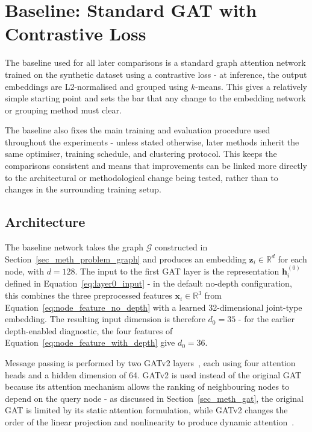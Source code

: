 \section{Baseline: Standard GAT with Contrastive Loss}
\label{sec_meth_baseline}

The baseline used for all later comparisons is a standard graph attention network
trained on the synthetic dataset using a contrastive loss -
at inference, the output embeddings are L2-normalised and grouped using $k$-means.
This gives a relatively simple starting point
and sets the bar that any change to the embedding network or grouping method must clear.

The baseline also fixes the main training and evaluation procedure used throughout the experiments -
unless stated otherwise,
later methods inherit the same optimiser, training schedule, and clustering protocol.
This keeps the comparisons consistent
and means that improvements can be linked more directly
to the architectural or methodological change being tested,
rather than to changes in the surrounding training setup.

\subsection{Architecture}
\label{sec_meth_baseline_arch}

The baseline network takes the graph $\mathcal{G}$ constructed in Section~\ref{sec_meth_problem_graph}
and produces an embedding $\mathbf{z}_i \in \mathbb{R}^{d}$ for each node, with $d=128$.
The input to the first GAT layer is the representation $\mathbf{h}_i^{(0)}$
defined in Equation~\eqref{eq:layer0_input} -
in the default no-depth configuration,
this combines the three preprocessed features $\mathbf{x}_i \in \mathbb{R}^{3}$
from Equation~\eqref{eq:node_feature_no_depth}
with a learned 32-dimensional joint-type embedding.
The resulting input dimension is therefore $d_0=35$ -
for the earlier depth-enabled diagnostic,
the four features of Equation~\eqref{eq:node_feature_with_depth} give $d_0=36$.

Message passing is performed by two GATv2 layers~\cite{brody2022gatv2},
each using four attention heads and a hidden dimension of 64.
GATv2 is used instead of the original GAT~\cite{velickovic2018gat}
because its attention mechanism allows the ranking of neighbouring nodes to depend on the query node -
as discussed in Section~\ref{sec_meth_gat},
the original GAT is limited by its static attention formulation,
while GATv2 changes the order of the linear projection and nonlinearity
to produce dynamic attention~\cite{brody2022gatv2}.

